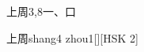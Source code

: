 \begin{entry}{上周}{3,8}{⼀、⼝}
  \begin{phonetics}{上周}{shang4 zhou1}[][HSK 2]
  \end{phonetics}
\end{entry}
